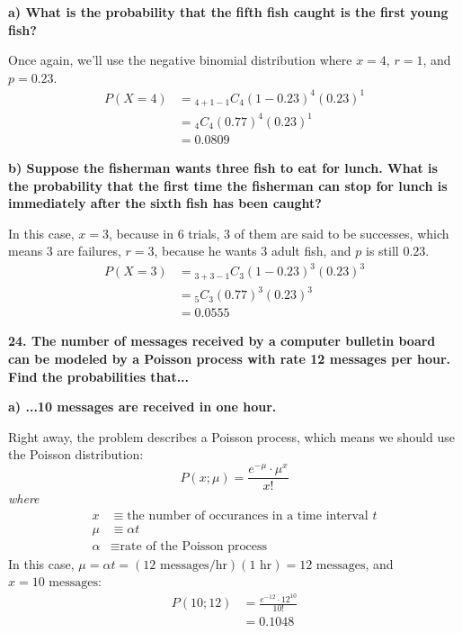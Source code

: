 \documentclass[12pt, letter]{article}
\begin{document}
\qquad \textbf{a) What is the probability that the fifth fish caught is the first young fish?}
\begin{center}
	Once again, we'll use the negative binomial distribution where $x=4$, $r=1$, and $p=0.23$.
	\begin{align*}
		P(X=4) &= {}_{4+1-1}C_{4}(1-0.23)^{4}(0.23)^{1} \\
		&= {}_{4}C_{4}(0.77)^{4}(0.23)^{1} \\
		&= \boxed{0.0809}
	\end{align*}
\end{center}

\qquad \textbf{b) Suppose the fisherman wants three fish to eat for lunch. What is the probability that the first time the fisherman can stop for lunch is immediately after the sixth fish has been caught?}
\begin{center}
	In this case, $x=3$, because in 6 trials, 3 of them are said to be successes, which means 3 are failures, $r=3$, because he wants 3 adult fish, and $p$ is still $0.23$.
	\begin{align*}
		P(X=3) &= {}_{3+3-1}C_{3}(1-0.23)^{3}(0.23)^{3} \\
		&= {}_{5}C_{3}(0.77)^{3}(0.23)^{3} \\
		&= \boxed{0.0555}
	\end{align*}
\end{center}

\pagebreak

\textbf{24. The number of messages received by a computer bulletin board can be modeled by a Poisson process with rate 12 messages per hour. Find the probabilities that...}

\qquad \textbf{a) ...10 messages are received in one hour.}
\begin{center}
	Right away, the problem describes a Poisson process, which means we should use the Poisson distribution:
	$$P(x;\mu) = \frac{e^{-\mu} \cdot \mu^{x}}{x!}$$
	\textit{where}
	\begin{align*}
		x &\equiv \text{the number of occurances in a time interval }t \\
		\mu &\equiv \alpha t \\
		\alpha &\equiv \text{rate of the Poisson process}
	\end{align*}
	In this case, $\mu = \alpha t = (\text{12 messages/hr})(\text{1 hr}) = \text{12 messages}$, and $x=\text{10 messages}$:
	\begin{align*}
		P(10;12) &= \frac{e^{-12} \cdot 12^{10}}{10!} \\
		&= \boxed{0.1048}
	\end{align*}
\end{center}
\end{document}
